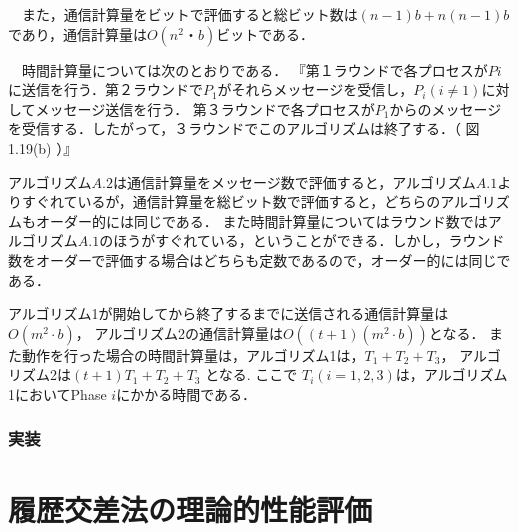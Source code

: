\documentclass[a4paper,12pt]{jsarticle}
\begin{document}
　また，通信計算量をビットで評価すると総ビット数は$(n-1)b+n(n-1)b$であり，通信計算量は$O(n^2・b)$ビットである．

　時間計算量については次のとおりである．
『第１ラウンドで各プロセスが$Pi$に送信を行う．第２ラウンドで$P_1$がそれらメッセージを受信し，$P_i(i≠1)$に対してメッセージ送信を行う．
第３ラウンドで各プロセスが$P_1$からのメッセージを受信する．したがって，３ラウンドでこのアルゴリズムは終了する．（ 図1.19(b) ）』

アルゴリズム$A.2$は通信計算量をメッセージ数で評価すると，アルゴリズム$A.1$よりすぐれているが，通信計算量を総ビット数で評価すると，どちらのアルゴリズムもオーダー的には同じである．
また時間計算量についてはラウンド数ではアルゴリズム$A.1$のほうがすぐれている，ということができる．しかし，ラウンド数をオーダーで評価する場合はどちらも定数であるので，オーダー的には同じである．








アルゴリズム1が開始してから終了するまでに送信される通信計算量は$O(m^2 \cdot b)$，
アルゴリズム2の通信計算量は$O((t+1)(m^2 \cdot b))$となる．
また動作を行った場合の時間計算量は，アルゴリズム1は，$ T_1 + T_2 + T_3 $，
アルゴリズム2は$ ( t + 1 ) T_1 + T_2 + T_3 $ となる. 
ここで $T_i (i=1, 2, 3)$は，アルゴリズム 1においてPhase $i$にかかる時間である．

\newpage

      \subsubsection{実装}
%
\section{履歴交差法の理論的性能評価}
\end{document}
